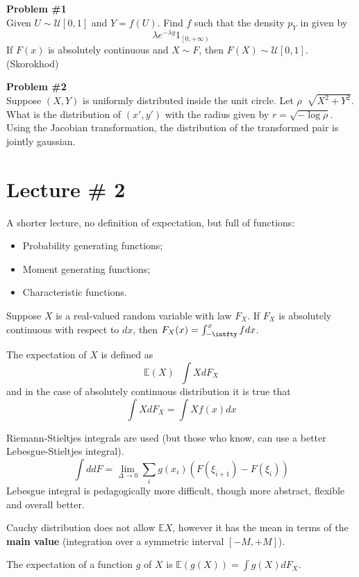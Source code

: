 \documentclass[a4paper]{article}
\newcommand{\clo}[1]{{\left [ #1 \right ]}}
\newcommand{\clop}[1]{{\left [ #1 \right )}}
\newcommand{\brac}[1]{{\left ( #1 \right )}}
\newcommand{\Ex}{\mathbb{E}}
\newcommand{\defn}{\mathop{\overset{\Delta}{=}}\nolimits}
\newcommand{\rus}[1]{\foreignlanguage{russian}{#1}}
\begin{document}
\noindent\textbf{Problem \#1}\hfill \\
	Given $U\sim \mathcal{U}\clo{0,1}$ and $Y=f(U)$. Find $f$ such that the density $p_Y$ in given by
	\[\lambda e^{-\lambda y} 1_{\clop{0,+\infty}}\]
	If $F(x)$ is absolutely continuous and $X\sim F$, then $F(X)\sim \mathcal{U}\clo{0,1}$. (Skorokhod)

\noindent\textbf{Problem \#2}\hfill \\
	Suppose $(X,Y)$ is uniformly distributed inside the unit circle. Let $\rho \defn \sqrt{X^2+Y^2}$. What is the distribution of $(x',y')$ with the radius given by $r = \sqrt{-\log \rho}$.
	Using the Jacobian transformation, the distribution of the transformed pair is jointly gaussian.


\section{Lecture \# 2} %
\label{sec:lecture_2}

A shorter lecture, no definition of expectation, but full of functions:
\begin{itemize}
	\item Probability generating functions;
	\item Moment generating functions;
	\item Characteristic functions.
\end{itemize}

Suppose $X$ is a real-valued random variable with law $F_X$. If $F_X$ is absolutely continuous with respect to $dx$, then $F_X(x) = \int_{-\intfty}^x f dx$.

The expectation of $X$ is defined as \[\Ex(X) \defn \int X d{F_X}\] and in the case of absolutely continuous distribution it is true that \[\int X d{F_X} = \int X f(x) dx\]

Riemann-Stieltjes integrals are used (but those who know, can use a better Lebesgue-Stieltjes integral).
\[\int d dF = \lim_{\Delta\to 0} \sum_i g(x_i) \brac{F(\xi_{i+1}) - F(\xi_i)}\]
Lebesgue integral is pedagogically more difficult, though more abstract, flexible and overall better.

Cauchy distribution does not allow $\Ex X$, however it has the mean in terms of the \textbf{main value} (integration over a symmetric interval $\clo{-M,+M}$).

The expectation of a function $g$ of $X$ is $\Ex\brac{g(X)} = \int g(X) dF_X$.
\end{document}
